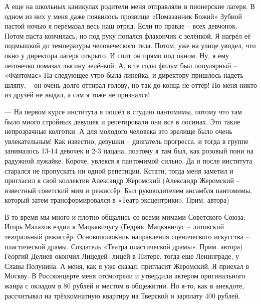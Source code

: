 А еще на школьных каникулах родители меня отправляли в пионерские лагеря. В
одном из них у меня даже появилось прозвище «Помазанник Божий» Зубной пастой
ночью я перемазал весь наш отряд. Если по правде – всех девчонок. Потом паста
кончилась, но под руку попался флакончик с зелёнкой. Я нагрёл её подмышкой до
температуры человеческого тела. Потом, уже на улице увидел, что окно у
директора лагеря открыто. И спит он прямо под окном. Ну, я ему легонечко
помазал лысину зелёнкой. А, в те годы фильм был популярный – «Фантомас» На
следующее утро была линейка, и директору пришлось надеть шляпу, – он очень
долго оттирал голову, но так до конца не оттёр! Но меня никто из друзей не
выдал, а сам я тоже не признался!


— На первом курсе института я пошёл в студию пантомимы, потому что там было
много стройных девушек и репетировали они все в лосинах. Это такие непрозрачные
колготки. А для молодого человека это зрелище было очень увлекательным! Как
известно, девушки – двигатель прогресса, и тогда в группе занималось 13-14
девочек и 2-3 пацана, поэтому я там был, как розовый пони на радужной лужайке.
Короче, увлекся я пантомимой сильно. Да и после института старался не
пропускать ни одной репетиции. Кстати, тогда меня заметил и пригласил в свой
коллектив Александр Жеромский (Александр Жеромский – известный советский мим и
режиссёр. Был руководителем ансамбля пантомимы, который затем трансформировался
в «Театр эксцентрики». Прим. автора)

В то время мы много и плотно общались со всеми мимами Советского Союза: Игорь
Малахов ездил к Мацкявичусу (Гедрюс Мацкявичус – литовский театральный
режиссёр. Основоположник направления сценического искусства – пластической
драмы. Создатель «Театра пластической драмы». Прим. автора) Георгий Делиев
окончил Лицедей- лицей в Питере, тогда еще Ленинграде, у Славы Полунина. А
меня, как я уже сказал, пригласит Жеромский. Я приехал в Москву. В Россконцерте
меня отсмотрели и утвердили актером оригинального жанра с окладом в 80 рублей и
местом в общежитии. Но я-то, как в анекдоте, рассчитывал на трёхкомнатную
квартиру на Тверской и зарплату 400 рублей.



